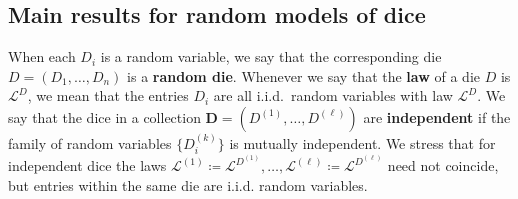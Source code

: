 \documentclass[reqno,a4paper,11pt]{amsart}
\newtheorem{theorem}[lemma]{Theorem}
\theoremstyle{remark}
\newcommand{\mc}[1]{{\mathcal #1}}
\newcommand{\mb}[1]{{\mathbf #1}}
\newcommand{\Tertu}[1]{\mbox{}\marginpar{\tiny\raggedright\hspace{0pt}{{\bf T:} {\color{blue}#1}}}}
\newcommand{\Gs}[1]{\mbox{}\marginpar{\tiny\raggedright\hspace{0pt}{{\bf G:} {\color{violet}#1}}}}
\numberwithin{equation}{section}
\begin{document}

%
%
%
%
%
%
%

\subsection{Main results for random models of dice}\label{subsec:random_dice}\hfill

When each $D_i$ is a random variable, we say that the corresponding die $D=(D_1,\hdots,D_n)$ is a \textbf{random die}. Whenever we say that the \textbf{law} of a die $D$ is $\mc L^D$, we mean that the entries $D_i$ are all i.i.d.\ random variables with law $\mc L^D$.
We say that the dice in a collection $\mb D= (D^{(1)},\hdots, D^{(\ell)})$ are \textbf{independent} if the family of random variables $\{D_i^{(k)}\}$ is mutually independent. We stress that for independent dice the laws $\mc L^{(1)}\coloneqq\mc L^{D^{(1)}},\dots, \mc L^{(\ell)}\coloneqq\mc L^{D^{(\ell)}}$ need not coincide, but entries within the same die are i.i.d. random variables.
\end{document}
